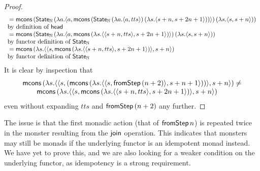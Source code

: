 \begin{proof}
$$\begin{array}{ll}
{}=  \mathsf{mcons}\, (\mathsf{State}_{\mathbb{N}}\,(\lambda a . \langle a,   
\mathsf{mcons}\, (\mathsf{State}_{\mathbb{N}} \,(\lambda a . \langle a, tts \rangle)\, (\lambda s . \langle s + n, s + 2n + 1 \rangle))
 \rangle)\, (\lambda s. \langle s, s + n \rangle))
\\ \mbox{by definition of } \mathsf{head} \\
{}= \mathsf{mcons}\, (\mathsf{State}_{\mathbb{N}}\,(\lambda a . \langle a,   
\mathsf{mcons}\, (\lambda s . \langle \langle s + n, tts \rangle, s + 2n + 1 \rangle)
 \rangle)\, (\lambda s. \langle s, s + n \rangle)) \\
\mbox{by functor definition of } \mathsf{State}_{\mathbb{N}}  \\
{}= \mathsf{mcons}\, (\lambda s. \langle \langle s, \mathsf{mcons}\, (\lambda s . \langle \langle s + n, tts \rangle, s + 2n + 1 \rangle) \rangle, s + n \rangle) \\ 
\mbox{by functor definition of } \mathsf{State}_{\mathbb{N}} \\
\end{array} 
$$
It is clear by inspection that 
$$
\begin{array}{l}
\mathsf{mcons}\, (\lambda s. \langle \langle s, (\mathsf{mcons}\, (\lambda s. \langle \langle s, \mathsf{fromStep}\, (n + 2) \rangle, s + n + 1 \rangle)) \rangle, s + n \rangle) \neq \\
\qquad \mathsf{mcons}\, (\lambda s. \langle \langle s, \mathsf{mcons}\, (\lambda s . \langle \langle s + n, tts \rangle, s + 2n + 1 \rangle) \rangle, s + n \rangle)
\end{array} 
$$
even without expanding $tts$ and $\mathsf{fromStep}\, (n + 2)$ any further.
\end{proof}

The issue is that the first monadic action (that of $\mathsf{fromStep}\, n$) is repeated twice in the monster resulting from the $\mathsf{join}$ operation. 
This indicates that monsters may still be monads if the underlying functor is an idempotent monad instead. 
We have yet to prove this, and we are also looking for a weaker condition on the underlying functor, as idempotency is a strong requirement.
